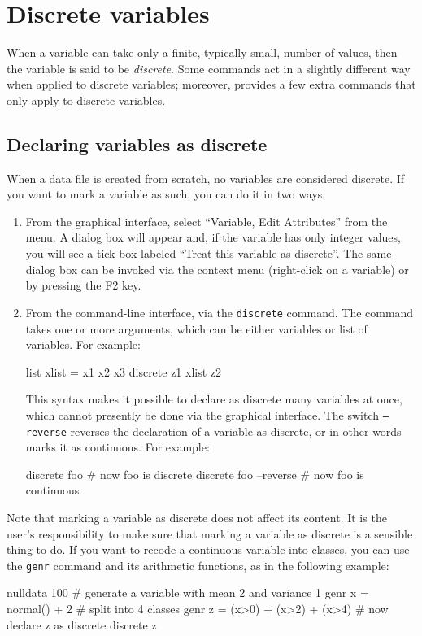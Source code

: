 \chapter{Discrete variables}
\label{chap-discrete}

When a variable can take only a finite, typically small, number of
values, then the variable is said to be \emph{discrete}. Some
 commands act in a slightly different way when applied to
discrete variables; moreover,  provides a few extra
commands that only apply to discrete variables.


\section{Declaring variables as discrete}
\label{discr-declare}

When a data file is created from scratch, no variables are considered
discrete. If you want to mark a variable as such, you can do it in two
ways.
\begin{enumerate}
\item From the graphical interface, select ``Variable, Edit
  Attributes'' from the menu. A dialog box will appear and, if the variable
  has only integer values, you will see a tick box labeled ``Treat this
  variable as discrete''.
  The same dialog box can be invoked via the context menu (right-click on
  a variable) or by pressing the F2 key.
\item From the command-line interface, via the \texttt{discrete}
  command. The command takes one or more arguments, which can be
  either variables or list of variables. For example:
\begin{code}
  list xlist = x1 x2 x3
  discrete z1 xlist z2
\end{code}
This syntax makes it possible to declare as discrete many
variables at once, which cannot presently be done via the graphical
interface. The switch \texttt{--reverse} reverses the declaration of a
variable as discrete, or in other words marks it as continuous.
For example:
\begin{code}
  discrete foo
  # now foo is discrete
  discrete foo --reverse
  # now foo is continuous
\end{code}
\end{enumerate}

Note that marking a variable as discrete does not affect its
content. It is the user's responsibility to make sure that marking a
variable as discrete is a sensible thing to do. If you want to recode
a continuous variable into classes, you can use the \texttt{genr}
command and its arithmetic functions, as in the following example:
\begin{code}
  nulldata 100
  # generate a variable with mean 2 and variance 1
  genr x = normal() + 2
  # split into 4 classes
  genr z = (x>0) + (x>2) + (x>4)
  # now declare z as discrete
  discrete z
\end{code}

